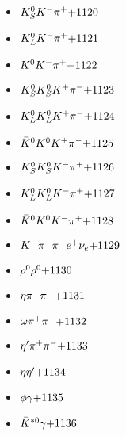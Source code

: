 \begin{multicols}{3}
\begin{itemize}
 \item $ K_{S}^{0} K^{-} \pi^{+} \hfill{+1120}$
 \item $ K_{L}^{0} K^{-} \pi^{+} \hfill{+1121}$
 \item $ K^{0} K^{-} \pi^{+} \hfill{+1122}$
 \item $ K_{S}^{0} K_{S}^{0} K^{+} \pi^{-} \hfill{+1123}$
 \item $ K_{L}^{0} K_{L}^{0} K^{+} \pi^{-} \hfill{+1124}$
 \item $ \bar{K}^{0} K^{0} K^{+} \pi^{-} \hfill{+1125}$
 \item $ K_{S}^{0} K_{S}^{0} K^{-} \pi^{+} \hfill{+1126}$
 \item $ K_{L}^{0} K_{L}^{0} K^{-} \pi^{+} \hfill{+1127}$
 \item $ \bar{K}^{0} K^{0} K^{-} \pi^{+} \hfill{+1128}$
 \item $ K^{-} \pi^{+} \pi^{-} e^{+} \nu_{e} \hfill{+1129}$
 \item $ \rho^{0} \rho^{0} \hfill{+1130}$
 \item $ \eta \pi^{+} \pi^{-} \hfill{+1131}$
 \item $ \omega \pi^{+} \pi^{-} \hfill{+1132}$
 \item $ {\eta^{\prime}} \pi^{+} \pi^{-} \hfill{+1133}$
 \item $ \eta {\eta^{\prime}} \hfill{+1134}$
 \item $ \phi \gamma \hfill{+1135}$
 \item $ \bar{K}^{*0} \gamma \hfill{+1136}$
 \end{itemize} 
 \end{multicols} 
